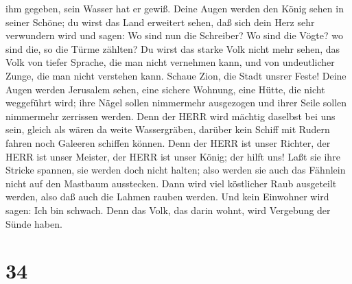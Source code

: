 ihm gegeben, sein Wasser hat er gewiß.  Deine Augen werden
den König sehen in seiner Schöne; du wirst das Land erweitert sehen,
 daß sich dein Herz sehr verwundern wird und sagen: Wo sind
nun die Schreiber? Wo sind die Vögte? wo sind die, so die Türme zählten?
 Du wirst das starke Volk nicht mehr sehen, das Volk von
tiefer Sprache, die man nicht vernehmen kann, und von undeutlicher
Zunge, die man nicht verstehen kann.  Schaue Zion, die
Stadt unsrer Feste! Deine Augen werden Jerusalem sehen, eine sichere
Wohnung, eine Hütte, die nicht weggeführt wird; ihre Nägel sollen
nimmermehr ausgezogen und ihrer Seile sollen nimmermehr zerrissen
werden.  Denn der HERR wird mächtig daselbst bei uns sein,
gleich als wären da weite Wassergräben, darüber kein Schiff mit Rudern
fahren noch Galeeren schiffen können.  Denn der HERR ist
unser Richter, der HERR ist unser Meister, der HERR ist unser König; der
hilft uns!  Laßt sie ihre Stricke spannen, sie werden doch
nicht halten; also werden sie auch das Fähnlein nicht auf den Mastbaum
ausstecken. Dann wird viel köstlicher Raub ausgeteilt werden, also daß
auch die Lahmen rauben werden.  Und kein Einwohner wird
sagen: Ich bin schwach. Denn das Volk, das darin wohnt, wird Vergebung
der Sünde haben.

\hypertarget{section-33}{%
\section{34}\label{section-33}}

